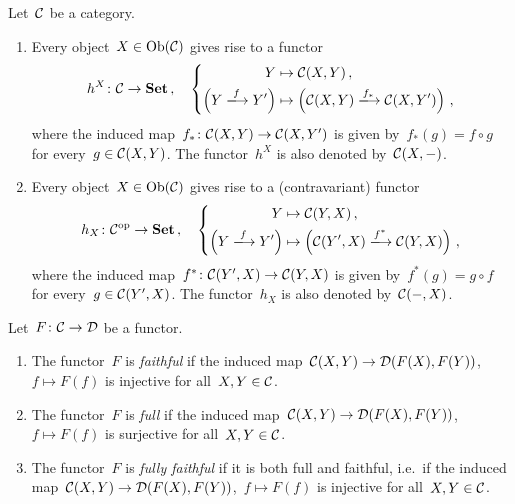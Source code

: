 \begin{example}
  Let~$\mathcal{C}$ be a category.
  \begin{enumerate}
    \item
      Every object~$X \in \operatorname{Ob}(\mathcal{C})$ gives rise to a functor
      \[
                h^X
        \colon  \Ccat
        \to     \Set \,,
        \quad   \left\{
                  \begin{aligned}
                              Y
                    &\mapsto  \Ccat(X,Y) \,,
                    \\
                              \left( Y \xlongto{f} Y' \right)
                    &\mapsto  \left( \Ccat(X,Y) \xlongto{f_*} \Ccat(X,Y') \right) \,,
                  \end{aligned}
                \right.
      \]
      where the induced map~$f_* \colon \mathcal{C}(X,Y) \to \mathcal{C}(X,Y')$ is given by~$f_*(g) = f \circ g$ for every~$g \in \mathcal{C}(X,Y)$.
      The functor~$h^X$ is also denoted by~$\mathcal{C}(X,-)$.
    \item
      Every object~$X \in \operatorname{Ob}(\mathcal{C})$ gives rise to a (contravariant) functor
      \[
                h_X
        \colon  \Ccat^\op
        \to     \Set \,,
        \quad   \left\{
                  \begin{aligned}
                              Y
                    &\mapsto  \Ccat(Y,X) \,,
                    \\
                              \left( Y \xlongto{f} Y' \right)
                    &\mapsto  \left( \Ccat(Y',X) \xlongto{f^*} \Ccat(Y,X) \right) \,,
                  \end{aligned}
                \right.
      \]
      where the induced map~$f^* \colon \mathcal{C}(Y',X) \to \mathcal{C}(Y,X)$ is given by~$f^*(g) = g \circ f$ for every~$g \in \mathcal{C}(Y',X)$.
      The functor~$h_X$ is also denoted by~$\mathcal{C}(-,X)$.
  \end{enumerate}
\end{example}


\begin{definition}[label=properties of functors]
  Let~$F \colon \mathcal{C} \to \mathcal{D}$ be a functor.
  \begin{enumerate}
    \item
      The functor~$F$ is \emph{faithful} if the induced map~$\mathcal{C}(X,Y) \to \mathcal{D}(F(X),F(Y))$,~$f \mapsto F(f)$ is injective for all~$X, Y \in \mathcal{C}$.
    \item
      The functor~$F$ is \emph{full} if the induced map~$\mathcal{C}(X,Y) \to \mathcal{D}(F(X),F(Y))$,~$f \mapsto F(f)$ is surjective for all~$X, Y \in \mathcal{C}$.
    \item
      The functor~$F$ is \emph{fully faithful} if it is both full and faithful, i.e.\ if the induced map~$\mathcal{C}(X,Y) \to \mathcal{D}(F(X),F(Y))$,~$f \mapsto F(f)$ is injective for all~$X, Y \in \mathcal{C}$.
  \end{enumerate}
\end{definition}






